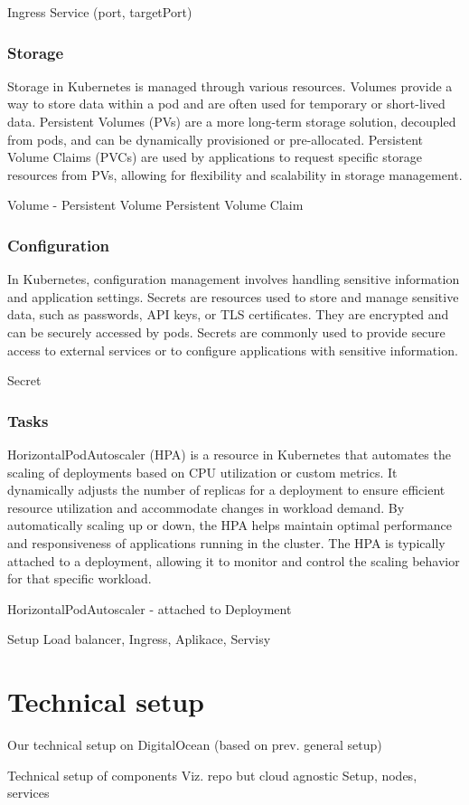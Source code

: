 \documentclass{article}
\begin{document}
Ingress
Service (port, targetPort)
\subsubsection*{Storage}
Storage in Kubernetes is managed through various resources. Volumes provide a way to store data within a pod and are often used for temporary or short-lived data. Persistent Volumes (PVs) are a more long-term storage solution, decoupled from pods, and can be dynamically provisioned or pre-allocated. Persistent Volume Claims (PVCs) are used by applications to request specific storage resources from PVs, allowing for flexibility and scalability in storage management.


Volume - Persistent Volume
Persistent Volume Claim
\subsubsection*{Configuration}
In Kubernetes, configuration management involves handling sensitive information and application settings. Secrets are resources used to store and manage sensitive data, such as passwords, API keys, or TLS certificates. They are encrypted and can be securely accessed by pods. Secrets are commonly used to provide secure access to external services or to configure applications with sensitive information.

Secret
\subsubsection{Tasks}
HorizontalPodAutoscaler (HPA) is a resource in Kubernetes that automates the scaling of deployments based on CPU utilization or custom metrics. It dynamically adjusts the number of replicas for a deployment to ensure efficient resource utilization and accommodate changes in workload demand. By automatically scaling up or down, the HPA helps maintain optimal performance and responsiveness of applications running in the cluster. The HPA is typically attached to a deployment, allowing it to monitor and control the scaling behavior for that specific workload.

HorizontalPodAutoscaler - attached to Deployment

Setup Load balancer, Ingress, Aplikace, Servisy
\section{Technical setup}
Our technical setup on DigitalOcean (based on prev. general setup) \par
Technical setup of components
Viz. repo but cloud agnostic
Setup, nodes, services
\end{document}
